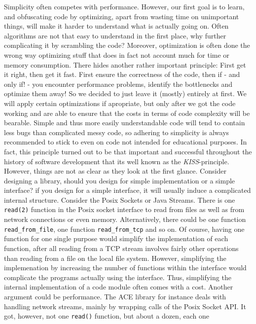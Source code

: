 Simplicity often competes with performance. 
However, our first goal is to learn, and obfuscating code by optimizing,
apart from wasting time on unimportant things, will make it harder to understand 
what is actually going on. 
Often algorithms are not that easy to understand in the first place, why 
further complicating it by scrambling the code?
Moreover, optimization is often done the wrong way optimizing stuff that 
does in fact not account much for time or memory consumption. 
There hides another rather important principle: First get it right, then get it 
fast.  
First ensure the correctness of the code, then if - and only if! - you encounter
performance problems, identify the bottlenecks and optimize them away!
So we decided to just leave it (mostly) entirely at first. 
We will apply certain optimizations if apropriate, but only after we got the 
code working and are able to ensure that the costs in terms of code complexity 
will be bearable.
Simple and thus more easily understandable code will tend to contain 
less bugs than complicated messy code, so adhering to simplicity is always 
recommended to stick to even on code not intended for educational purposes.
In fact, this principle turned out to be that important and successful 
throughout the history of software development that its well known as the 
\emph{KISS}-principle.
However, things are not as clear as they look at the first glance.
Consider designing a library, should you design for simple implementation or 
a simple interface?
if you design for a simple interface, it will usually induce a complicated 
internal structure. 
Consider the Posix Sockets or Java Streams.
There is one \texttt{read(2)} function in the Posix socket interface to read 
from files as well as from network connections or even memory.
Alternatively, there could be one function \texttt{read\_from\_file}, one 
function \texttt{read\_from\_tcp} and so on.
Of course, having one function for one single purpose would simplify the
implementation of each function, after all reading from a TCP stream involves
fairly other operations than reading from a file on the local file system.
However, simplifying the implemenation by increasing the number of functions 
within the interface would complicate the programs actually using the interface.
Thus, simplifying the internal implementation of a code module often comes with
a cost.
Another argument could be performance. 
The ACE library for instance deals with handling network streams, mainly by
wrapping calls of the Posix Socket API.
It got, however, not one \texttt{read()} function, but about a dozen, each one 
